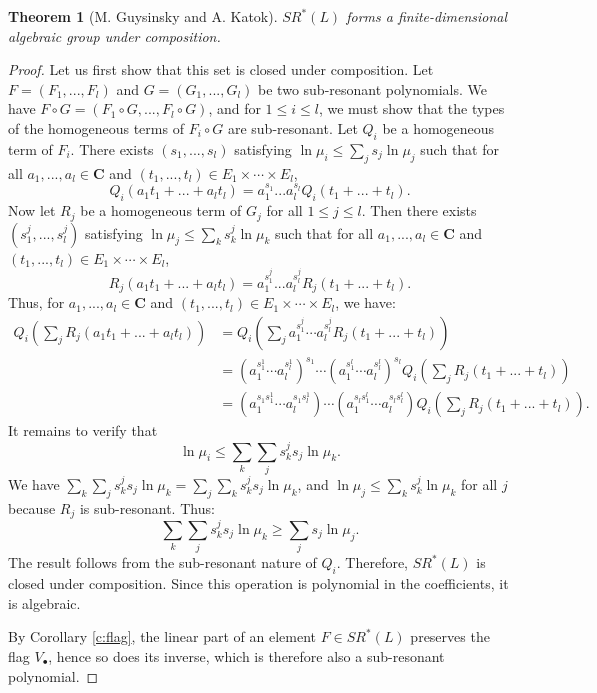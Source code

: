 \documentclass[english,11pt]{amsart}
\newtheorem{theorem}{Theorem}[section]
\theoremstyle{definition}
\theoremstyle{remark}
\numberwithin{equation}{section}
\newcommand{\C}{\mathbf{C}}
\begin{document}
\begin{theorem}[M. Guysinsky and A. Katok]\label{katoklie}
$SR^*(L)$ forms a finite-dimensional algebraic group under composition.
\end{theorem}
\begin{proof}
Let us first show that this set is closed under composition. Let $F = (F_1, ..., F_l)$ and $G = (G_1, ..., G_l)$ be two sub-resonant polynomials. We have $F \circ G = (F_1 \circ G, ..., F_l \circ G)$, and for $1 \leq i \leq l$, we must show that the types of the homogeneous terms of $F_i \circ G$ are sub-resonant. Let $Q_i$ be a homogeneous term of $F_i$. There exists $(s_1, ..., s_l)$ satisfying $\ln\mu_i \leq \displaystyle\sum_j s_j\ln\mu_j$ such that for all $a_1, ..., a_l \in \C$ and $(t_1, ..., t_l) \in E_1 \times \cdots \times E_l$,
$$
Q_i(a_1t_1 + ... + a_lt_l) = a_1^{s_1}...a_l^{s_l}Q_i(t_1+...+t_l).
$$
Now let $R_j$ be a homogeneous term of $G_j$ for all $1 \leq j \leq l$. Then there exists $(s_1^{j}, ..., s_l^{j})$ satisfying $\ln\mu_j \leq \displaystyle\sum_k s_k^j\ln\mu_k$ such that for all $a_1, ..., a_l \in \C$ and $(t_1, ..., t_l) \in E_1 \times \cdots \times E_l$,
$$
R_j(a_1t_1 + ... + a_lt_l) = a_1^{s_1^{j}}...a_l^{s_l^{j}}R_j(t_1+...+t_l).
$$
Thus, for $a_1, ..., a_l \in \C$ and $(t_1, ..., t_l) \in E_1 \times \cdots \times E_l$, we have:
\begin{align*}
    Q_i \left( \sum_j R_j(a_1t_1 + ... + a_lt_l)\right) &= Q_i \left( \sum_j a_1^{s_1^{j}}\cdots a_l^{s_l^{j}}R_j(t_1+...+t_l)\right) \\
    &= \left(a_1^{s_1^{1}}\cdots a_l^{s_l^{1}}\right)^{s_1} \cdots \left(a_1^{s_1^{l}}\cdots a_l^{s_l^{l}}\right)^{s_l}Q_i\left( \sum_j R_j(t_1+...+t_l) \right) \\
    &= \left(a_1^{s_1s_1^{1}}\cdots a_l^{s_1s_l^{1}}\right) \cdots \left(a_1^{s_ls_1^{l}}\cdots a_l^{s_ls_l^{l}}\right)Q_i\left( \sum_j R_j(t_1+...+t_l) \right).
\end{align*}
It remains to verify that
$$
\ln\mu_i \leq \sum_k \sum_j s_k^j s_j \ln\mu_k.
$$
We have $\displaystyle\sum_k \sum_j s_k^j s_j \ln\mu_k = \sum_j \sum_k s_k^j s_j \ln\mu_k$, and $\ln\mu_j \leq \displaystyle\sum_k s_k^j\ln\mu_k$ for all $j$ because $R_j$ is sub-resonant. Thus:
$$
\sum_k \sum_j s_k^j s_j \ln\mu_k \geq \sum_j s_j\ln\mu_j.
$$
The result follows from the sub-resonant nature of $Q_i$. Therefore, $SR^*(L)$ is closed under composition. Since this operation is polynomial in the coefficients, it is algebraic.

By Corollary \ref{c:flag}, the linear part of an element $F \in SR^*(L)$ preserves the flag $V_\bullet$, hence so does its inverse, which is therefore also a sub-resonant polynomial.


\end{proof}
\end{document}
